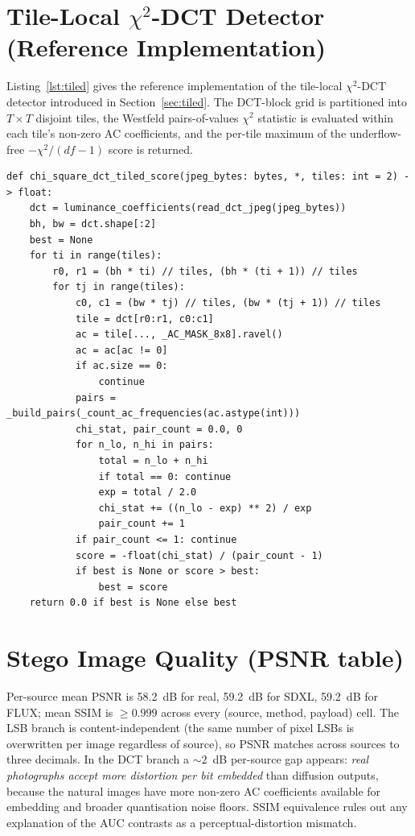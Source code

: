 \documentclass[10pt,twocolumn,a4paper]{article}
\begin{document}
\section{Tile-Local $\chi^2$-DCT Detector (Reference Implementation)}
\label{app:tiled-code}
Listing~\ref{lst:tiled} gives the reference implementation of the tile-local $\chi^2$-DCT detector introduced in Section~\ref{sec:tiled}. The DCT-block grid is partitioned into $T\!\times\!T$ disjoint tiles, the Westfeld pairs-of-values $\chi^2$ statistic is evaluated within each tile's non-zero AC coefficients, and the per-tile maximum of the underflow-free $-\chi^2/(df\!-\!1)$ score is returned.
\begin{lstlisting}[label={lst:tiled},caption={Tile-local $\chi^2$-DCT detector. Partition the DCT-block grid into $T\!\times\!T$ disjoint tiles, evaluate the Westfeld test inside each, and return the max per-tile underflow-free score.}]
def chi_square_dct_tiled_score(jpeg_bytes: bytes, *, tiles: int = 2) -> float:
    dct = luminance_coefficients(read_dct_jpeg(jpeg_bytes))
    bh, bw = dct.shape[:2]
    best = None
    for ti in range(tiles):
        r0, r1 = (bh * ti) // tiles, (bh * (ti + 1)) // tiles
        for tj in range(tiles):
            c0, c1 = (bw * tj) // tiles, (bw * (tj + 1)) // tiles
            tile = dct[r0:r1, c0:c1]
            ac = tile[..., _AC_MASK_8x8].ravel()
            ac = ac[ac != 0]
            if ac.size == 0:
                continue
            pairs = _build_pairs(_count_ac_frequencies(ac.astype(int)))
            chi_stat, pair_count = 0.0, 0
            for n_lo, n_hi in pairs:
                total = n_lo + n_hi
                if total == 0: continue
                exp = total / 2.0
                chi_stat += ((n_lo - exp) ** 2) / exp
                pair_count += 1
            if pair_count <= 1: continue
            score = -float(chi_stat) / (pair_count - 1)
            if best is None or score > best:
                best = score
    return 0.0 if best is None else best
\end{lstlisting}

\section{Stego Image Quality (PSNR table)}
\label{app:quality}
Per-source mean PSNR is 58.2~dB for real, 59.2~dB for SDXL, 59.2~dB for FLUX; mean SSIM is $\geq\!0.999$ across every (source, method, payload) cell. The LSB branch is content-independent (the same number of pixel LSBs is overwritten per image regardless of source), so PSNR matches across sources to three decimals. In the DCT branch a $\sim\!2$~dB per-source gap appears: \emph{real photographs accept more distortion per bit embedded} than diffusion outputs, because the natural images have more non-zero AC coefficients available for embedding and broader quantisation noise floors. SSIM equivalence rules out any explanation of the AUC contrasts as a perceptual-distortion mismatch.
\end{document}
